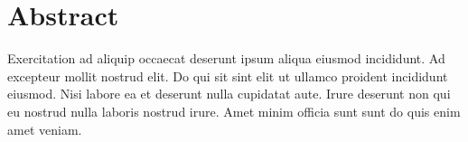 \section*{Abstract}
Exercitation ad aliquip occaecat deserunt ipsum aliqua eiusmod incididunt. Ad excepteur mollit nostrud elit. Do qui sit sint elit ut ullamco proident incididunt eiusmod. Nisi labore ea et deserunt nulla cupidatat aute. Irure deserunt non qui eu nostrud nulla laboris nostrud irure. Amet minim officia sunt sunt do quis enim amet veniam.
